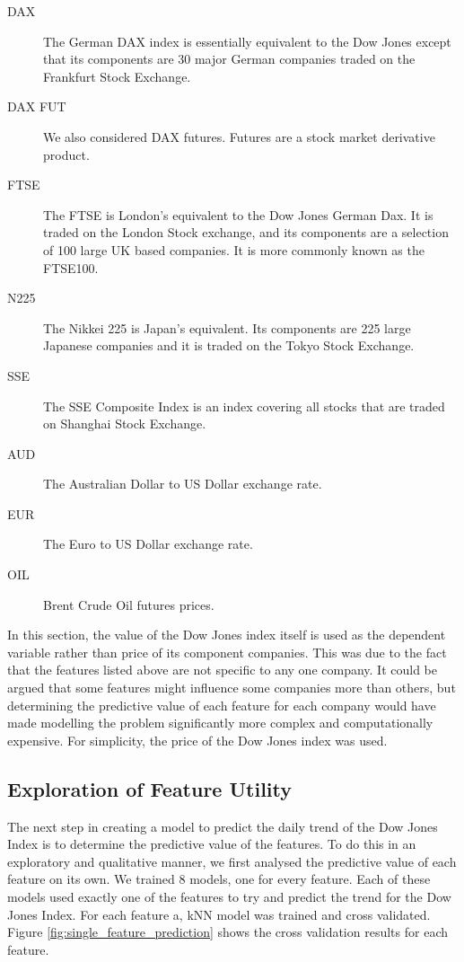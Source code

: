 \documentclass{report}
\begin{document}
\begin{description}
  \item[DAX] The German DAX index is essentially equivalent to the Dow Jones except that its components are 30 major German companies traded on the Frankfurt Stock Exchange.
  
  \item[DAX FUT] We also considered DAX futures. Futures are a stock market derivative product.
  
  \item[FTSE] The FTSE is London's equivalent to the Dow Jones German Dax. It is traded on the London Stock exchange, and its components are a selection of 100 large UK based companies. It is more commonly known as the FTSE100.
  
  \item[N225] The Nikkei 225 is Japan's equivalent. Its components are 225 large Japanese companies and it is traded on the Tokyo Stock Exchange.
  
  \item[SSE] The SSE Composite Index is an index covering all stocks that are traded on Shanghai Stock Exchange. 
  
  \item[AUD] The Australian Dollar to US Dollar exchange rate.
  
  \item[EUR] The Euro to US Dollar exchange rate.
  
  \item[OIL] Brent Crude Oil futures prices.
      
\end{description}

In this section, the value of the Dow Jones index itself is used as the dependent variable rather than price of its component companies. This was due to the fact that the features listed above are not specific to any one company. It could be argued that some features might influence some companies more than others, but determining the predictive value of each feature for each company would have made modelling the problem significantly more complex and computationally expensive. For simplicity, the price of the Dow Jones index was used.

\subsection{Exploration of Feature Utility}

The next step in creating a model to predict the daily trend of the Dow Jones Index is to determine the predictive value of the features. To do this in an exploratory and qualitative manner, we first analysed the predictive value of each feature on its own. We trained 8 models, one for every feature. Each of these models used exactly one of the features to try and predict the trend for the Dow Jones Index. For each feature a, kNN model was trained and cross validated. Figure \ref{fig:single_feature_prediction} shows the cross validation results for each feature.
\end{document}
